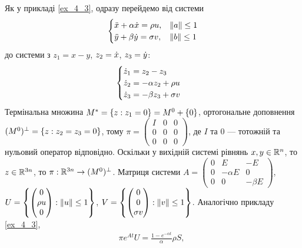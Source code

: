 \begin{example}\label{ex_4_5}
    Як у прикладі \ref{ex_4_3}, одразу перейдемо від системи
    \begin{gather*}
        \begin{cases}
            \ddot{x} + \alpha \dot{x} = \rho u, & \left\Vert a \right\Vert \leq 1 \\
            \ddot{y} + \beta \dot{y} = \sigma v, & \left\Vert b \right\Vert \leq 1
        \end{cases}
    \end{gather*}
    до системи з $z_1 = x - y$, $z_2 = \dot{x}$, $z_3 = \dot{y}$:
    \begin{gather*}
        \begin{cases}
            \dot{z}_1 = z_2 - z_3 \\
            \dot{z}_2 = -\alpha z_2 + \rho u \\
            \dot{z}_3 = -\beta z_3 + \sigma v
        \end{cases}
    \end{gather*}
    Термінальна множина $M^* = \left\{z: z_1 = 0 \right\} = M^0 + \{0\}$, ортогональне доповнення
    $(M^0)^\perp =\left\{z: z_2 = z_3 = 0 \right\}$, тому $\pi = \begin{pmatrix}
        I & 0 & 0 \\
        0 & 0 & 0 \\
        0 & 0 & 0
    \end{pmatrix}$, де $I$ та $0$ --- тотожній та нульовий оператор відповідно.
    Оскільки у вихідній системі рівнянь $x, y \in \mathbb{R}^n$, то $z \in \mathbb{R}^{3n}$,
    то $\pi : \mathbb{R}^{3n} \to (M^0)^\perp$. Матриця системи
    $A = \begin{pmatrix}
        0 & E & -E \\
        0 & -\alpha E & 0 \\
        0 & 0 & -\beta E
    \end{pmatrix}$,
    $
    U = \left\{ \begin{pmatrix}0 \\ \rho u \\ 0 \end{pmatrix} : \left\Vert u \right\Vert \leq 1\right\}
    $,
    $
    V = \left\{ \begin{pmatrix}0 \\ 0 \\ \sigma v \end{pmatrix} : \left\Vert v \right\Vert \leq 1\right\}
    $.
    Аналогічно прикладу \ref{ex_4_3},
    \begin{gather*}
        \pi e^{At} U = \frac{1 - e^{-\alpha t}}{\alpha} \rho S, \;

\end{gather*}
\end{example}
